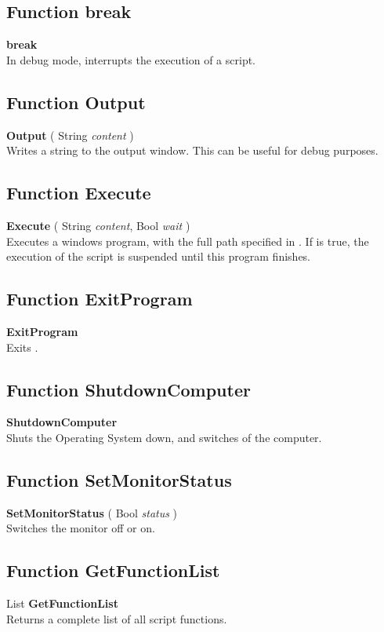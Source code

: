 \subsection{Function break \label{F:break}}
\textbf{break} \\
In debug mode, interrupts the execution of a script.

\subsection{Function Output \label{F:Output}}
\textbf{Output} ( String \textit{content} ) \\
Writes a string to the output window. This can be useful for debug purposes.

\subsection{Function Execute \label{F:Execute}}
\textbf{Execute} ( String \textit{content}, Bool \textit{wait} ) \\
Executes a windows program, with the full path specified in . If  is true, the execution of the script is suspended until this program finishes.

\subsection{Function ExitProgram \label{F:ExitProgram}}
\textbf{ExitProgram} \\
Exits \softwarename.

\subsection{Function ShutdownComputer \label{F:ShutdownComputer}}
\textbf{ShutdownComputer} \\
Shuts the Operating System down, and switches of the computer.

\subsection{Function SetMonitorStatus \label{F:SetMonitorStatus}}
\textbf{SetMonitorStatus} ( Bool \textit{status} ) \\
Switches the monitor off or on.

\subsection{Function GetFunctionList \label{F:GetFunctionList}}
List \textbf{GetFunctionList} \\
Returns a complete list of all script functions.

